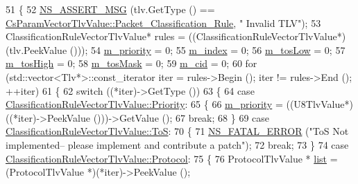 \begin{DoxyCode}
51 \{
52   \hyperlink{assert_8h_aff5ece9066c74e681e74999856f08539}{NS\_ASSERT\_MSG} (tlv.GetType () == 
      \hyperlink{classns3_1_1CsParamVectorTlvValue_a72ca87bab4986bec8ee954c8d223ca2ba56aa6665cbc24e0799ae7c6d056addc8}{CsParamVectorTlvValue::Packet\_Classification\_Rule}, \textcolor{stringliteral}{"
      Invalid TLV"});
53   ClassificationRuleVectorTlvValue* rules = ((ClassificationRuleVectorTlvValue*)(tlv.PeekValue ()));
54   \hyperlink{classns3_1_1IpcsClassifierRecord_ac92730633e3a9b2143ddc48140780be8}{m\_priority} = 0;
55   \hyperlink{classns3_1_1IpcsClassifierRecord_a62ea826b5a15e0db1dfeec2f85c870cf}{m\_index} = 0;
56   \hyperlink{classns3_1_1IpcsClassifierRecord_a2bf94f3ee75c2ea466fc1ba40d3da488}{m\_tosLow} = 0;
57   \hyperlink{classns3_1_1IpcsClassifierRecord_afa4c97d018dd7bc728631f7cecc24120}{m\_tosHigh} = 0;
58   \hyperlink{classns3_1_1IpcsClassifierRecord_a51cec1405f4bac281234a0e4b2c9a683}{m\_tosMask} = 0;
59   \hyperlink{classns3_1_1IpcsClassifierRecord_ab1c9aa611b20574c557841cc23b2762b}{m\_cid} = 0;
60   \textcolor{keywordflow}{for} (std::vector<Tlv*>::const\_iterator iter = rules->Begin (); iter != rules->End (); ++iter)
61     \{
62       \textcolor{keywordflow}{switch} ((*iter)->GetType ())
63         \{
64         \textcolor{keywordflow}{case} \hyperlink{classns3_1_1ClassificationRuleVectorTlvValue_a9945c44c631de44d3b9c8dc9560cb820afb33cbae5e7663e0ffec4d0ec84520ec}{ClassificationRuleVectorTlvValue::Priority}:
65           \{
66             \hyperlink{classns3_1_1IpcsClassifierRecord_ac92730633e3a9b2143ddc48140780be8}{m\_priority} = ((U8TlvValue*)((*iter)->PeekValue ()))->GetValue ();
67             \textcolor{keywordflow}{break};
68           \}
69         \textcolor{keywordflow}{case} \hyperlink{classns3_1_1ClassificationRuleVectorTlvValue_a9945c44c631de44d3b9c8dc9560cb820a89ce8792247ffb6bf26a8493de8f899d}{ClassificationRuleVectorTlvValue::ToS}:
70           \{
71             \hyperlink{group__fatal_ga5131d5e3f75d7d4cbfd706ac456fdc85}{NS\_FATAL\_ERROR} (\textcolor{stringliteral}{"ToS Not implemented-- please implement and contribute a patch"});
72             \textcolor{keywordflow}{break};
73           \}
74         \textcolor{keywordflow}{case} \hyperlink{classns3_1_1ClassificationRuleVectorTlvValue_a9945c44c631de44d3b9c8dc9560cb820ac596932971436a37dd565fa950f1e9df}{ClassificationRuleVectorTlvValue::Protocol}:
75           \{
76             ProtocolTlvValue * \hyperlink{openflow-interface_8h_afd9bcfa176617760671b67580f536fa7}{list} = (ProtocolTlvValue *)(*iter)->PeekValue ();

\end{DoxyCode}

